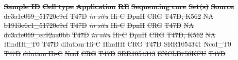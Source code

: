 \documentclass[a4,center,fleqn]{NAR}
\providecommand{\DIFdel}[1]{{\protect\color{red}\sout{#1}}}                      %
\providecommand{\DIFdelFL}[1]{\DIFdel{#1}} %
\begin{document}
\textbf{\DIFdelFL{Sample ID}} %
\textbf{\DIFdelFL{Cell type}} %
\textbf{\DIFdelFL{Application}} %
\textbf{\DIFdelFL{RE}} %
\textbf{\DIFdelFL{Sequencing core}} %
\textbf{\DIFdelFL{Set(s)}} %
\textbf{\DIFdelFL{Source}} %
\DIFdelFL{dc3a1e069\_51720e9cf }%
\DIFdelFL{T47D }%
\textit{\DIFdelFL{in situ}} %
\DIFdelFL{Hi-C }%
\DIFdelFL{DpnII }%
\DIFdelFL{CRG }%
\DIFdelFL{T47D, K562 }%
\DIFdelFL{NA }%
\DIFdelFL{b1913e6c1\_51720e9cf }%
\DIFdelFL{T47D }%
\textit{\DIFdelFL{in situ}} %
\DIFdelFL{Hi-C }%
\DIFdelFL{DpnII }%
\DIFdelFL{CRG }%
\DIFdelFL{T47D }%
\DIFdelFL{NA }%
\DIFdelFL{dc3a1e069\_ec92aa0bb }%
\DIFdelFL{T47D }%
\textit{\DIFdelFL{in situ}} %
\DIFdelFL{Hi-C }%
\DIFdelFL{DpnII }%
\DIFdelFL{CRG }%
\DIFdelFL{T47D, K562 }%
\DIFdelFL{NA }%
\DIFdelFL{HindIII\_T0 }%
\DIFdelFL{T47D }%
\DIFdelFL{dilution Hi-C }%
\DIFdelFL{HindIII }%
\DIFdelFL{CRG }%
\DIFdelFL{T47D }%
\DIFdelFL{SRR1054341 }%
\DIFdelFL{NcoI\_T0    }%
\DIFdelFL{T47D }%
\DIFdelFL{dilution Hi-C }%
\DIFdelFL{NcoI      }%
\DIFdelFL{CRG }%
\DIFdelFL{T47D }%
\DIFdelFL{SRR1054343 }%
\DIFdelFL{ENCLB758KFU }%
\DIFdelFL{T47D }%
\end{document}
